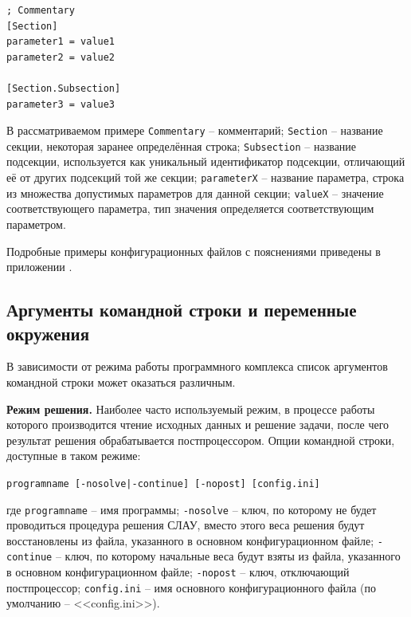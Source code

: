 \documentclass[a4paper,14pt]{article}
\newcommand{\CodeFont}[1]{{\small{\texttt{#1}}}}
\begin{document}
\vspace{-0.8cm}
\begin{singlespace}
\begin{footnotesize}
\begin{verbatim}
; Commentary
[Section]
parameter1 = value1
parameter2 = value2

[Section.Subsection]
parameter3 = value3
\end{verbatim}
\end{footnotesize}
\end{singlespace}
\vspace{-0.2cm}

\noindent В рассматриваемом примере \CodeFont{Commentary} -- комментарий; \CodeFont{Section} -- название секции, некоторая заранее определённая строка; \CodeFont{Subsection} -- название подсекции, используется как уникальный идентификатор подсекции, отличающий её от других подсекций той же секции; \CodeFont{parameterX} -- название параметра, строка из множества допустимых параметров для данной секции; \CodeFont{valueX} -- значение соответствующего параметра, тип значения определяется соответствующим параметром.

Подробные примеры конфигурационных файлов с пояснениями приведены в приложении .

\subsection{Аргументы командной строки и переменные окружения}
В зависимости от режима работы программного комплекса список аргументов командной строки может оказаться различным.

\textbf{Режим решения.} Наиболее часто используемый режим, в процессе работы которого производится чтение исходных данных и решение задачи, после чего результат решения обрабатывается постпроцессором. Опции командной строки, доступные в таком режиме:

\CodeFont{programname [-nosolve|-continue] [-nopost] [config.ini]}

\noindent где \CodeFont{programname} -- имя программы; \CodeFont{-nosolve} -- ключ, по которому не будет проводиться процедура решения СЛАУ, вместо этого веса решения будут восстановлены из файла, указанного в основном конфигурационном файле; \CodeFont{-continue} -- ключ, по которому начальные веса будут взяты из файла, указанного в основном конфигурационном файле; \CodeFont{-nopost} -- ключ, отключающий постпроцессор; \CodeFont{config.ini} -- имя основного конфигурационного файла (по умолчанию -- <<config.ini>>).
\end{document}
